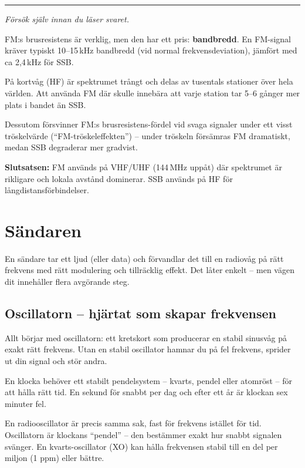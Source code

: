 \documentclass[a4paper,11pt,twoside]{book}
\newcommand{\emoji}[1]{{\emojifont #1}}
\begin{document}
\medskip
\noindent\rule{\textwidth}{0.4pt}
{\small\itshape Försök själv innan du läser svaret.}
\medskip

\begin{worked}[title={Lösning -- Fallgropsfråga 2.2\,F}]
FM:s brusresistens är verklig, men den har ett pris: \textbf{bandbredd}.
En FM-signal kräver typiskt 10--15\,kHz bandbredd (vid normal
frekvensdeviation), jämfört med ca 2,4\,kHz för SSB.

På kortvåg (HF) är spektrumet trångt och delas av tusentals
stationer över hela världen. Att använda FM där skulle innebära
att varje station tar 5--6 gånger mer plats i bandet än SSB.

Dessutom försvinner FM:s brusresistens-fördel vid svaga signaler
under ett visst tröskelvärde (``FM-tröskeleffekten'') -- under
tröskeln försämras FM dramatiskt, medan SSB degraderar mer
gradvist.

\textbf{Slutsatsen:} FM används på VHF/UHF (144\,MHz uppåt) där
spektrumet är rikligare och lokala avstånd dominerar. SSB används
på HF för långdistansförbindelser.
\end{worked}

\section{Sändaren}

En sändare tar ett ljud (eller data) och förvandlar det till
en radiovåg på rätt frekvens med rätt modulering och tillräcklig
effekt. Det låter enkelt -- men vägen dit innehåller flera
avgörande steg.

\subsection{Oscillatorn -- hjärtat som skapar frekvensen}

Allt börjar med oscillatorn: ett kretskort som producerar en
stabil sinusvåg på exakt rätt frekvens. Utan en stabil oscillator
hamnar du på fel frekvens, sprider ut din signal och stör andra.

\begin{storybox}[{\emoji{⌚} Klockan som aldrig stannar}]
En klocka behöver ett stabilt pendelsystem -- kvarts, pendel
eller atomröst -- för att hålla rätt tid. En sekund för snabbt
per dag och efter ett år är klockan sex minuter fel.

En radiooscillator är precis samma sak, fast för frekvens
istället för tid. Oscillatorn är klockans ``pendel'' -- den
bestämmer exakt hur snabbt signalen svänger. En kvarts-oscillator
(XO) kan hålla frekvensen stabil till en del per miljon (1 ppm)
eller bättre.
\end{storybox}
\end{document}
